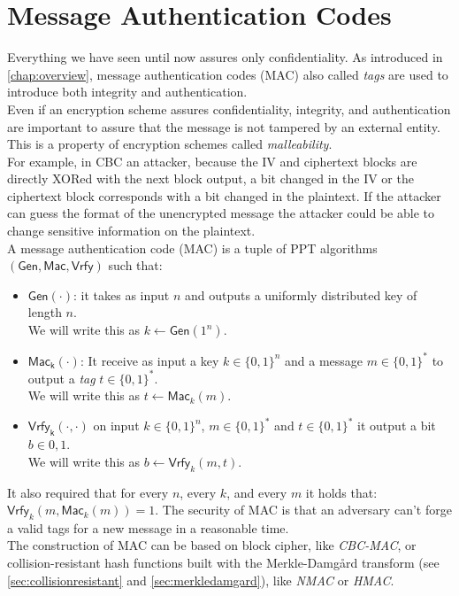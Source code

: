 \section{Message Authentication Codes}\label{sec:mac}
Everything we have seen until now assures only confidentiality. As introduced in \autoref{chap:overview}, message authentication codes (MAC) also called \emph{tags} are used to introduce both integrity and authentication.\\
Even if an encryption scheme assures confidentiality, integrity, and authentication are important to assure that the message is not tampered by an external entity. This is a property of encryption schemes called \emph{malleability}.\\
For example, in CBC an attacker, because the IV and ciphertext blocks are directly XORed with the next block output, a bit changed in the IV or the ciphertext block corresponds with a bit changed in the plaintext. If the attacker can guess the format of the unencrypted message the attacker could be able to change sensitive information on the plaintext.\\
A message authentication code (MAC) is a tuple of PPT algorithms $(\mathsf{Gen},\mathsf{Mac},\mathsf{Vrfy})$ such that:
\begin{itemize}
    \item{$\mathsf{Gen(\cdot)}$: it takes as input $n$ and outputs a uniformly distributed key of length $n$.\\We will write this as $k \leftarrow \mathsf{Gen}(1^n)$.}
    \item{$\mathsf{Mac_k(\cdot)}$: It receive as input a key $k \in \{0,1\}^n$ and a message $m \in \{0,1\}^{*}$ to output a \emph{tag} $t \in \{0,1\}^{*}$.\\We will write this as $t \leftarrow \mathsf{Mac}_k(m)$.}
    \item{$\mathsf{Vrfy_k(\cdot,\cdot)}$ on input $k \in \{0,1\}^n$, $m \in \{0,1\}^{*}$ and $t \in \{0,1\}^{*}$ it output a bit $b \in {0,1}$.\\We will write this as $b \leftarrow \mathsf{Vrfy}_k(m, t)$.}
\end{itemize}
It also required that for every $n$, every $k$, and every $m$ it holds that: $\mathsf{Vrfy}_k(m, \mathsf{Mac}_k(m)) = 1$.
The security of MAC is that an adversary can't forge a valid tags for a new message in a reasonable time.\\
The construction of MAC can be based on block cipher, like \emph{CBC-MAC}, or collision-resistant hash functions built with the Merkle-Damg\r{a}rd transform (see \autoref{sec:collisionresistant} and \autoref{sec:merkledamgard}), like \emph{NMAC} or \emph{HMAC}.

